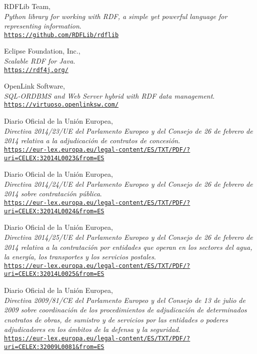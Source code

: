 \begin{thebibliography}{X}
            RDFLib Team,
            \\ \textit{Python library for working with RDF, a simple yet powerful language for representing information}.
            \\ \texttt{\url{https://github.com/RDFLib/rdflib}}
            
            Eclipse Foundation, Inc.,
            \\ \textit{Scalable RDF for Java}.
            \\ \texttt{\url{https://rdf4j.org/}}
            
            OpenLink Software,
            \\ \textit{SQL-ORDBMS and Web Server hybrid with RDF data management}.
            \\ \texttt{\url{https://virtuoso.openlinksw.com/}}
            
            Diario Oficial de la Unión Europea,
            \\ \textit{Directiva 2014/23/UE del Parlamento Europeo y del Consejo de 26 de febrero de 2014 relativa a la adjudicación de contratos de concesión}.
            \\ \texttt{\url{https://eur-lex.europa.eu/legal-content/ES/TXT/PDF/?uri=CELEX:32014L0023&from=ES}}
            
            Diario Oficial de la Unión Europea,
            \\ \textit{Directiva 2014/24/UE del Parlamento Europeo y del Consejo de 26 de febrero de 2014 sobre contratación pública}.
            \\ \texttt{\url{https://eur-lex.europa.eu/legal-content/ES/TXT/PDF/?uri=CELEX:32014L0024&from=ES}}
            
            Diario Oficial de la Unión Europea,
            \\ \textit{Directiva 2014/25/UE del Parlamento Europeo y del Consejo de 26 de febrero de 2014 relativa a la contratación por entidades que operan en los sectores del agua, la energía, los transportes y los servicios postales}.
            \\ \texttt{\url{https://eur-lex.europa.eu/legal-content/ES/TXT/PDF/?uri=CELEX:32014L0025&from=ES}}
            
            Diario Oficial de la Unión Europea,
            \\ \textit{Directiva 2009/81/CE del Parlamento Europeo y del Consejo de 13 de julio de 2009 sobre coordinación de los procedimientos de adjudicación de determinados cnotratos de obras, de sumistro y de servicios por las entidades o poderes adjudicadores en los ámbitos de la defensa y la seguridad}.
            \\ \texttt{\url{https://eur-lex.europa.eu/legal-content/ES/TXT/PDF/?uri=CELEX:32009L0081&from=ES}}
            

\end{thebibliography}
